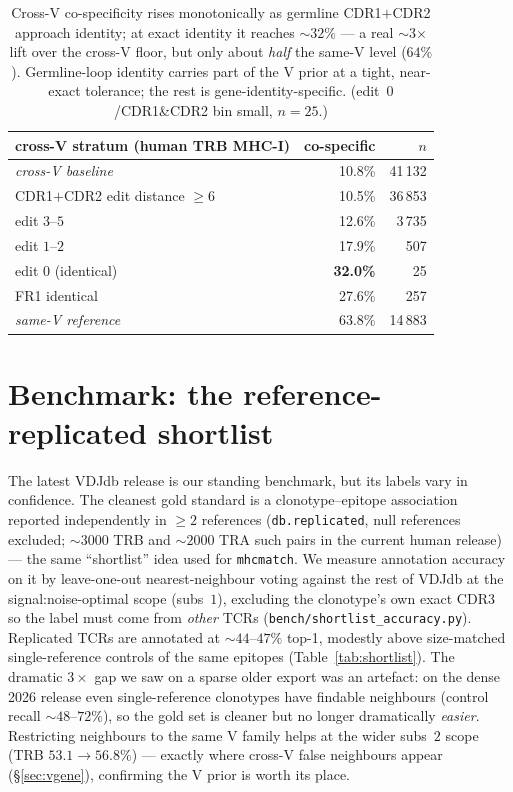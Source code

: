 \documentclass[11pt]{article}
\theoremstyle{oldplain}
\theoremstyle{oldrem}
\begin{document}
\begin{table}[ht]\centering\small
\begin{tabular}{lrr}
\hline
cross-V stratum (human TRB MHC-I) & co-specific & $n$\\
\hline
\emph{cross-V baseline}        & 10.8\% & 41\,132\\
CDR1$+$CDR2 edit distance $\ge6$ & 10.5\% & 36\,853\\
\quad edit $3$--$5$            & 12.6\% &  3\,735\\
\quad edit $1$--$2$            & 17.9\% &    507\\
\quad edit $0$ (identical)     & \textbf{32.0\%} &  25\\
FR1 identical                  & 27.6\% &   257\\
\emph{same-V reference}        & 63.8\% & 14\,883\\
\hline
\end{tabular}
\caption{Cross-V co-specificity rises monotonically as germline CDR1$+$CDR2 approach identity; at exact
identity it reaches $\sim$$32\%$ --- a real $\sim$3$\times$ lift over the cross-V floor, but only about
\emph{half} the same-V level ($64\%$). Germline-loop identity carries part of the V prior at a tight,
near-exact tolerance; the rest is gene-identity-specific. (edit~$0$/CDR1\&CDR2 bin small, $n=25$.)}
\label{tab:vregion}
\end{table}

\section{Benchmark: the reference-replicated shortlist}\label{sec:shortlist}
The latest VDJdb release is our standing benchmark, but its labels vary in confidence. The cleanest gold
standard is a clonotype--epitope association reported independently in $\ge2$ references
(\texttt{db.replicated}, null references excluded; $\sim$$3000$ TRB and $\sim$$2000$ TRA such pairs in
the current human release) --- the same ``shortlist'' idea used for \texttt{mhcmatch}. We measure
annotation accuracy on it by leave-one-out nearest-neighbour voting against the rest of VDJdb at the
signal:noise-optimal scope (subs~$1$), excluding the clonotype's own exact CDR3 so the label must come
from \emph{other} TCRs (\texttt{bench/shortlist\_accuracy.py}). Replicated TCRs are annotated at
$\sim$$44$--$47\%$ top-1, modestly above size-matched single-reference controls of the same epitopes
(Table~\ref{tab:shortlist}). The dramatic $3\times$ gap we saw on a sparse older export was an artefact:
on the dense 2026 release even single-reference clonotypes have findable neighbours (control recall
$\sim$$48$--$72\%$), so the gold set is cleaner but no longer dramatically \emph{easier}. Restricting
neighbours to the same V family helps at the wider subs~$2$ scope (TRB $53.1\!\to\!56.8\%$) --- exactly
where cross-V false neighbours appear (\S\ref{sec:vgene}), confirming the V prior is worth its place.
\end{document}
